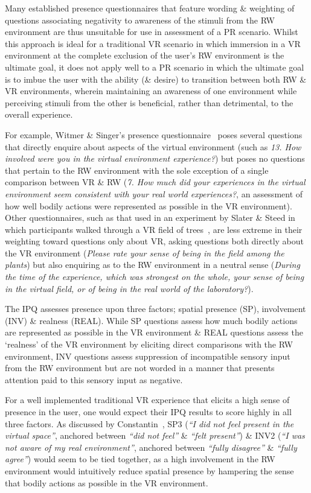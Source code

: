 Many established presence questionnaires that feature wording \& weighting of questions associating negativity to awareness of the stimuli from the RW environment are thus unsuitable for use in assessment of a PR scenario. Whilst this approach is ideal for a traditional VR scenario in which immersion in a VR environment at the complete exclusion of the user's RW environment is the ultimate goal, it does not apply well to a PR scenario in which the ultimate goal is to imbue the user with the ability (\& desire) to transition between both RW \& VR environments, wherein maintaining an awareness of one environment while perceiving stimuli from the other is beneficial, rather than detrimental, to the overall experience.

For example, Witmer \& Singer's presence questionnaire~\cite{Witmer1998} poses several questions that directly enquire about aspects of the virtual environment (such as \textit{13. How involved were you in the virtual environment experience?}) but poses no questions that pertain to the RW environment with the sole exception of a single comparison between VR \& RW (\textit{7. How much did your experiences in the virtual environment seem consistent with your real world experiences?}, an assessment of how well bodily actions were represented as possible in the VR environment). Other questionnaires, such as that used in an experiment by Slater \& Steed in which participants walked through a VR field of trees~\cite{Slater1998}, are less extreme in their weighting toward questions only about VR, asking questions both directly about the VR environment (\textit{Please rate your sense of being in the field among the plants}) but also enquiring as to the RW environment in a neutral sense (\textit{During the time of the experience, which was strongest on the whole, your sense of being in the virtual field, or of being in the real world of the laboratory?}).

The IPQ assesses presence upon three factors; spatial presence (SP), involvement (INV) \& realness (REAL). While SP questions assess how much bodily actions are represented as possible in the VR environment \& REAL questions assess the `realness' of the VR environment by eliciting direct comparisons with the RW environment, INV questions assess suppression of incompatible sensory input from the RW environment but are not worded in a manner that presents attention paid to this sensory input as negative.



For a well implemented traditional VR experience that elicits a high sense of presence in the user, one would expect their IPQ results to score highly in all three factors. As discussed by Constantin~\cite{Constantin2003a}, SP3 (\textit{``I did not feel present in the virtual space''}, anchored between \textit{``did not feel''} \& \textit{``felt present''}) \& INV2 (\textit{``I was not aware of my real environment''}, anchored between \textit{``fully disagree''} \& \textit{``fully agree''}) would seem to be tied together, as a high involvement in the RW environment would intuitively reduce spatial presence by hampering the sense that bodily actions as possible in the VR environment.

